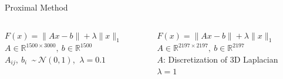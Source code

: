 \documentclass[10pt]{beamer}
\begin{document}
   \begin{frame}{Proximal Method}
   	\begin{columns}[T]
   		\begin{column}{.5\textwidth}
   			$F(x) = \lVert Ax - b \rVert + \lambda \lVert x \rVert_1$\\
   			$A \in \mathbb{R}^{1500 \times 3000},\:b \in \mathbb{R}^{1500}$\\
   			$A_{ij},\:b_i\:$ \textasciitilde $\:\mathcal{N}(0,1)$, $\:\lambda = 0.1$\\
   			\vspace{15pt}
   			\resizebox{\linewidth}{!}{}
   			\begin{center}
   				\hspace{-3pt}
   			\end{center}
   		\pause
   		\end{column}\hfill
   		\begin{column}{.5\textwidth}
   			$F(x) = \lVert Ax - b \rVert + \lambda \lVert x \rVert_1$\\
   			$A \in \mathbb{R}^{2197 \times 2197},\:b \in \mathbb{R}^{2197}$\\
   			$A$: \small Discretization of 3D Laplacian\\
   			\normalsize$\lambda = 1$\\
   			\vspace{8pt}
   			\resizebox{\linewidth}{!}{}
   			\begin{center}
   				\hspace{5pt}
   			\end{center}
   		\end{column}
   	\end{columns}
   \end{frame}
   
\end{document}
